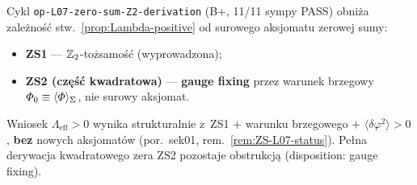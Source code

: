 \begin{remark}\label{rem:Lambda-L07-strengthened}
Cykl \texttt{op-L07-zero-sum-Z2-derivation} (B+, 11/11 sympy PASS)
obni\.za zale\.zno\'s\'c stw.~\ref{prop:Lambda-positive} od surowego
aksjomatu zerowej sumy:
\begin{itemize}[nosep]
  \item \textbf{ZS1} --- $\mathbb{Z}_2$-to\.zsamo\'s\'c (wyprowadzona);
  \item \textbf{ZS2 (cz\k{e}\'s\'c kwadratowa)} --- \textbf{gauge fixing}
    przez warunek brzegowy $\varPhi_0\equiv\langle\varPhi\rangle_\Sigma$,
    nie surowy aksjomat.
\end{itemize}
Wniosek $\Lambda_{\mathrm{eff}}>0$ wynika strukturalnie z~ZS1 $+$
warunku brzegowego $+$ $\langle\delta\varphi^2\rangle>0$, \textbf{bez}
nowych aksjomat\'ow (por.\ sek01,
rem.~\ref{rem:ZS-L07-status}). Pe\l{}na derywacja kwadratowego zera
ZS2 pozostaje obstrukcj\k{a} (disposition: gauge fixing).
\end{remark}

%
%
%
%
%
%

